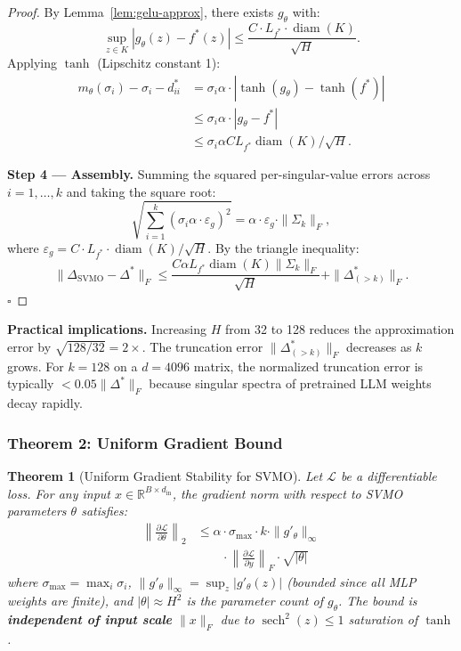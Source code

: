 \documentclass[conference]{IEEEtran}
\newtheorem{theorem}{Theorem}[section]
\newcommand{\RR}{\mathbb{R}}
\newcommand{\sech}{\operatorname{sech}}
\newcommand{\diam}{\operatorname{diam}}
\begin{document}
\begin{proof}
By Lemma~\ref{lem:gelu-approx}, there exists $g_\theta$ with:
\begin{equation}
\sup_{z \in K} |g_\theta(z) - f^*(z)| \leq \frac{C \cdot L_{f^*} \cdot \diam(K)}{\sqrt{H}}.
\end{equation}
Applying $\tanh$ (Lipschitz constant 1):
\begin{align}
m_\theta(\sigma_i) - \sigma_i - d_{ii}^*
&= \sigma_i \alpha \cdot |\tanh(g_\theta) - \tanh(f^*)| \nonumber\\
&\leq \sigma_i \alpha \cdot |g_\theta - f^*| \nonumber\\
&\leq \sigma_i \alpha C L_{f^*} \diam(K) / \sqrt{H}.
\end{align}

\textbf{Step 4 --- Assembly.}
Summing the squared per-singular-value errors across $i=1,\dots,k$ and taking the square root:
\begin{equation}
\sqrt{\sum_{i=1}^k (\sigma_i \alpha \cdot \varepsilon_g)^2} = \alpha \cdot \varepsilon_g \cdot \|\Sigma_k\|_F,
\end{equation}
where $\varepsilon_g = C \cdot L_{f^*} \cdot \diam(K) / \sqrt{H}$. By the triangle inequality:
\begin{equation}
\|\Delta_{\text{SVMO}} - \Delta^*\|_F \leq \frac{C \alpha L_{f^*} \diam(K) \|\Sigma_k\|_F}{\sqrt{H}} + \|\Delta^*_{(>k)}\|_F.
\end{equation}
$\square$
\end{proof}

\textbf{Practical implications.} Increasing $H$ from 32 to 128 reduces the approximation error by $\sqrt{128/32} = 2\times$. The truncation error $\|\Delta^*_{(>k)}\|_F$ decreases as $k$ grows. For $k=128$ on a $d=4096$ matrix, the normalized truncation error is typically $<0.05\|\Delta^*\|_F$ because singular spectra of pretrained LLM weights decay rapidly.

\subsubsection{Theorem 2: Uniform Gradient Bound}

\begin{theorem}[Uniform Gradient Stability for SVMO]
\label{thm:svmo-grad}
Let $\mathcal{L}$ be a differentiable loss. For any input $x \in \RR^{B \times d_{\text{in}}}$, the gradient norm with respect to SVMO parameters $\theta$ satisfies:
\begin{align}
\left\|\frac{\partial\mathcal{L}}{\partial\theta}\right\|_2 &\leq \alpha \cdot \sigma_{\max} \cdot k \cdot \|g'_\theta\|_\infty\nonumber\\
&\qquad \cdot \left\|\frac{\partial\mathcal{L}}{\partial y}\right\|_F \cdot \sqrt{|\theta|}
\end{align}
where $\sigma_{\max} = \max_i \sigma_i$, $\|g'_\theta\|_\infty = \sup_z |g'_\theta(z)|$ (bounded since all MLP weights are finite), and $|\theta| \approx H^2$ is the parameter count of $g_\theta$. The bound is \textbf{independent of input scale} $\|x\|_F$ due to $\sech^2(z) \leq 1$ saturation of $\tanh$.
\end{theorem}
\end{document}
